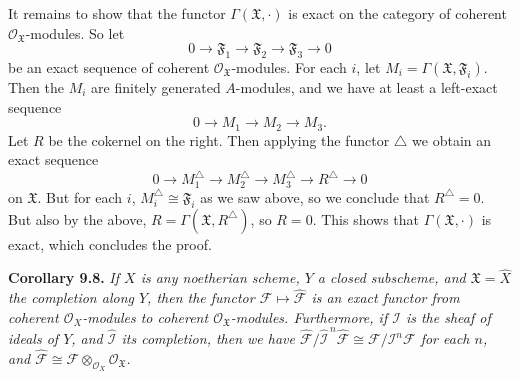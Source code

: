 {It remains to show that the functor $\Gamma(\mathfrak X,\cdot)$ is exact on the category of coherent $\mathcal O_{\mathfrak X}$-modules. So let
\[
0\longrightarrow\mathfrak F_1\longrightarrow\mathfrak F_2\longrightarrow\mathfrak F_3\longrightarrow0
\]
be an exact sequence of coherent $\mathcal O_{\mathfrak X}$-modules. For each $i$, let $M_i=\Gamma(\mathfrak X,\mathfrak F_i)$. Then the $M_i$ are finitely generated $A$-modules, and we have at least a left-exact sequence
\[
0\longrightarrow M_1\longrightarrow M_2\longrightarrow M_3.
\]
Let $R$ be the cokernel on the right. Then applying the functor $\triangle$ we obtain an exact sequence
\[
0\longrightarrow M_1^\triangle\longrightarrow M_2^\triangle\longrightarrow M_3^\triangle\longrightarrow R^\triangle\longrightarrow0
\]
on $\mathfrak X$. But for each $i$, $M_i^\triangle\cong\mathfrak F_i$ as we saw above, so we conclude that $R^\triangle=0$. But also by the above, $R=\Gamma(\mathfrak X,R^\triangle)$, so $R=0$. This shows that $\Gamma(\mathfrak X,\cdot)$ is exact, which concludes the proof.

\medskip
\noindent\hypertarget{result-II-9.8}{}\textbf{Corollary 9.8.} \emph{If $X$ is any noetherian scheme, $Y$ a closed subscheme, and $\mathfrak X=\widehat X$ the completion along $Y$, then the functor $\mathcal F\mapsto\widehat{\mathcal F}$ is an exact functor from coherent $\mathcal O_X$-modules to coherent $\mathcal O_{\mathfrak X}$-modules. Furthermore, if $\mathcal I$ is the sheaf of ideals of $Y$, and $\widehat{\mathcal I}$ its completion, then we have $\widehat{\mathcal F}/\widehat{\mathcal I}^{\,n}\widehat{\mathcal F}\cong\mathcal F/\mathcal I^n\mathcal F$ for each $n$, and $\widehat{\mathcal F}\cong\mathcal F\otimes_{\mathcal O_X}\mathcal O_{\mathfrak X}$.}}
